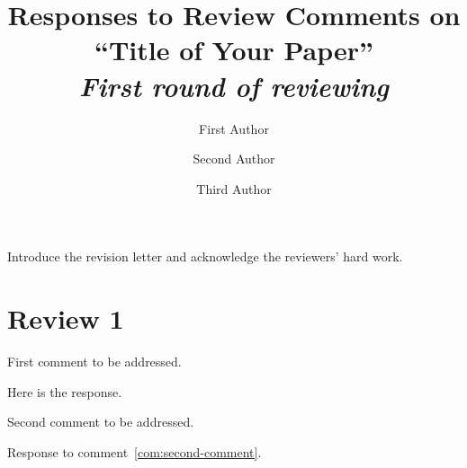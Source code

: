 \documentclass[a4]{article}
\begin{document}
\title{Responses to Review Comments on ``Title of Your Paper'' \\
  \vspace{0.5em} \large \emph{First round of reviewing}}
\author{First Author \and Second Author \and Third Author}

\maketitle

\setlength\parindent{0pt}

\noindent Introduce the revision letter and acknowledge the reviewers'
hard work.

\section{Review 1}\label{sec:review1}

\begin{revcom}
  First comment to be addressed.
\end{revcom}

\begin{response}
  Here is the response.
\end{response}

\begin{revcom}
  Second comment to be addressed.
\end{revcom}

\begin{response}
  Response to comment~\ref{com:second-comment}.
\end{response}



\end{document}

